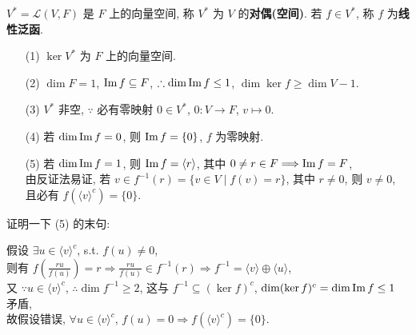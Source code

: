 \documentclass{note}
\begin{document}
\begin{df}[对偶(空间)和线性泛函]
    $V^*=\mathcal{L}(V,F)$ 是 $F$ 上的向量空间, 称 $V^*$ 为 $V$ 的\textbf{对偶(空间)}. 若 $f\in V^*$, 称 $f$ 为\textbf{线性泛函}.
\end{df}

\begin{itemize}
    \item[(1)] $\ker V^*$ 为 $F$ 上的向量空间.
    \item[(2)] $\dim F=1$, $\operatorname{Im} f\subseteq F$, $\therefore\dim\operatorname{Im} f\leq 1$, $\dim\ker f\geq\dim V-1$.
    \item[(3)] $V^*$ 非空, $\because$ 必有零映射 $0\in V^*$, $0:V\rightarrow F$, $v\mapsto 0$.
    \item[(4)] 若 $\dim\operatorname{Im} f=0$, 则 $\operatorname{Im} f=\{0\}$, $f$ 为零映射.
    \item[(5)] 若 $\dim\operatorname{Im} f=1$, 则 $\operatorname{Im} f=\langle r\rangle$, 其中 $0\neq r\in F\Longrightarrow\operatorname{Im} f=F$,\\
    由反证法易证, 若 $v\in f^{-1}(r)=\{v\in V\mid f(v)=r\}$, 其中 $r\neq 0$, 则 $v\neq 0$, 且必有 $f(\langle v\rangle^c)=\{0\}$.
\end{itemize}
证明一下 (5) 的末句:
\begin{pf}
    假设 $\exists u\in\langle v\rangle^c$, s.t. $f(u)\neq 0$,\\
    则有 $f\left(\frac{ru}{f(u)}\right)=r\Longrightarrow\frac{ru}{f(u)}\in f^{-1}(r)\Longrightarrow f^{-1}=\langle v\rangle\oplus\langle u\rangle$,\\
    又 $\because u\in\langle v\rangle^c$, $\therefore\dim f^{-1}\geq 2$, 这与 $f^{-1}\subseteq(\ker f)^c$, $\dim(\ker f)^c=\dim\operatorname{Im} f\leq 1$ 矛盾,\\
    故假设错误, $\forall u\in\langle v\rangle^c$, $f(u)=0\Longrightarrow f(\langle v\rangle^c)=\{0\}$.
\end{pf}
\end{document}

